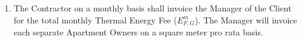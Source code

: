 \begin{enumerate}

\begin{center}
\begin{tabu}{|X|X|X|X|X|X|} \tabucline{}
{{with translate "en" .Contract.Tables.calc_energy_fee}} %
	{{.Columns | column}} \\\tabucline{}
	{{range .Headers}} {{.|row}} \\\tabucline{} {{end}} %
	{{range .Rows}} {{.|row}} \\\tabucline{} {{end}} %
	\bfseries {{total .}} \\\tabucline{} %
{{end}}
\end{tabu}
\end{center}

	\item The Contractor on a monthly basis shall invoice the Manager of the Client for the total monthly Thermal Energy Fee ($E^{m}_{F, G}$). The Manager will invoice each separate Apartment Owners on a square meter pro rata basis.
\end{enumerate}

